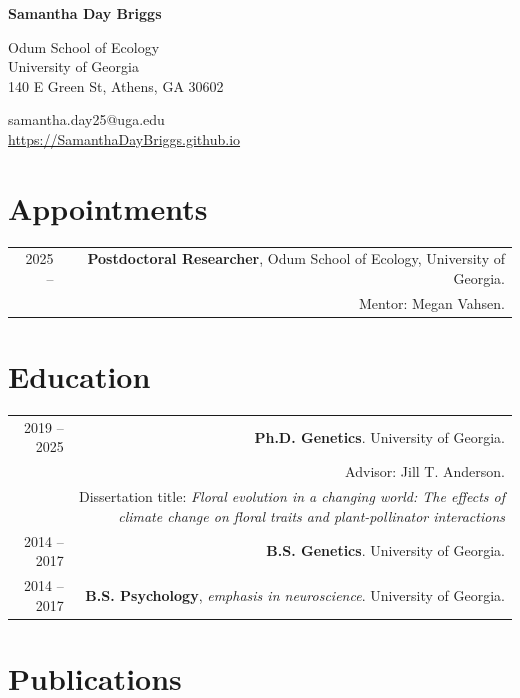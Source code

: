 \documentclass[letterpaper, 11pt]{article}
\def\name{Samantha Day Briggs}
\begin{document}
{\huge\textbf{\color{Classic Botanical Green}\name}}
\vspace{0.1in}

\noindent
\begin{minipage}[t]{0.62\linewidth}
Odum School of Ecology\\
University of Georgia\\
140 E Green St, Athens, GA 30602
\end{minipage}%
\hfill
\begin{minipage}[t]{0.30\linewidth}
\raggedleft
samantha.day25@uga.edu\\
\url{https://SamanthaDayBriggs.github.io}
\end{minipage}



\section*{Appointments}
\begin{tabular}{DR}
2025 --     & \textbf{Postdoctoral Researcher}, Odum School of Ecology, University of Georgia. \\
& Mentor: Megan Vahsen.\\ [0.5ex]

\end{tabular}


\section*{Education}
\begin{tabular}{DR}
2019 -- 2025 & \textbf{Ph.D. Genetics}. University of Georgia. \\ 
 & Advisor: Jill T. Anderson. \\ 
 & Dissertation title: \textit{Floral evolution in a changing world: The effects of climate change on floral traits and plant-pollinator interactions} \\[0.5ex]
2014 -- 2017 & \textbf{B.S. Genetics}. University of Georgia. \\
2014 -- 2017 & \textbf{B.S. Psychology}, \textit{emphasis in neuroscience}. University of Georgia.\\


\end{tabular}

\section*{Publications}
\end{document}
